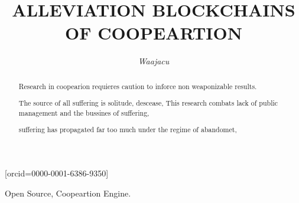 \documentclass[a4paper,fleqn]{cas-sc}
\begin{document}
\let\WriteBookmarks\relax
\def\floatpagepagefraction{1}
\def\textpagefraction{.001}

\title[mode = title]{ALLEVIATION BLOCKCHAINS OF COOPEARTION}




  \author[1]{\textit{Waajacu}}[orcid=0000-0001-6386-9350]
  \cormark[1] 


  \address[1]{Santiago Restrepo Ruiz, Colombia.}





\begin{abstract}
  Research in coopearion requieres caution to inforce non weaponizable results. 



  The source of all suffering is solitude, descease, 
  This research combats lack of public management and the bussines of suffering, 
  
  suffering has propagated far too much under the regime of abandomet, 

  
  
\end{abstract}
 \begin{keywords}
  Open Source, Coopeartion Engine. 
 \end{keywords}

 \maketitle
\end{document}
